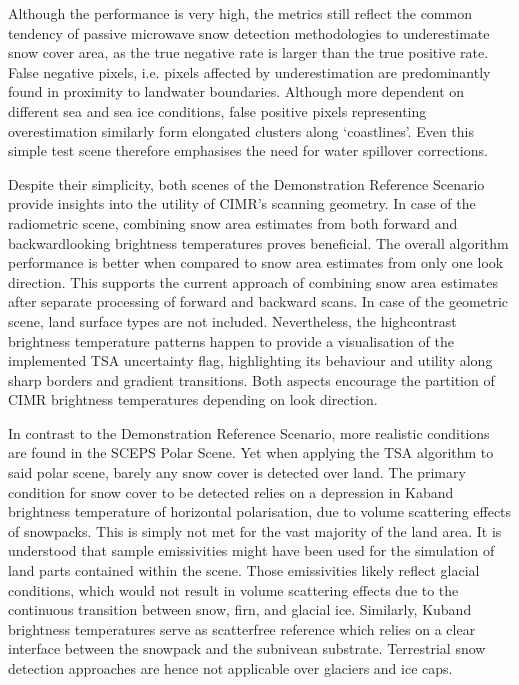 \documentclass[letterpaper,10pt,english]{jupyterBook}
\begin{document}
\sphinxAtStartPar
Although the performance is very high, the metrics still reflect the common tendency of passive microwave snow detection methodologies to underestimate snow cover area, as the true negative rate is larger than the true positive rate.
False negative pixels, i.e. pixels affected by underestimation are predominantly found in proximity to land\sphinxhyphen{}water boundaries.
Although more dependent on different sea and sea ice conditions, false positive pixels representing overestimation similarly form elongated clusters along ‘coastlines’.
Even this simple test scene therefore emphasises the need for water spill\sphinxhyphen{}over corrections.

\sphinxAtStartPar
Despite their simplicity, both scenes of the Demonstration Reference Scenario provide insights into the utility of CIMR’s scanning geometry.
In case of the radiometric scene, combining snow area estimates from both forward and backward\sphinxhyphen{}looking brightness temperatures proves beneficial.
The overall algorithm performance is better when compared to snow area estimates from only one look direction.
This supports the current approach of combining snow area estimates after separate processing of forward and backward scans.
In case of the geometric scene, land surface types are not included.
Nevertheless, the high\sphinxhyphen{}contrast brightness temperature patterns happen to provide a visualisation of the implemented TSA uncertainty flag, highlighting its behaviour and utility along sharp borders and gradient transitions.
Both aspects encourage the partition of CIMR brightness temperatures depending on look direction.

\sphinxAtStartPar
In contrast to the Demonstration Reference Scenario, more realistic conditions are found in the SCEPS Polar Scene.
Yet when applying the TSA algorithm to said polar scene, barely any snow cover is detected over land.
The primary condition for snow cover to be detected relies on a depression in Ka\sphinxhyphen{}band brightness temperature of horizontal polarisation, due to volume scattering effects of snowpacks.
This is simply not met for the vast majority of the land area.
It is understood that sample emissivities might have been used for the simulation of land parts contained within the scene.
Those emissivities likely reflect glacial conditions, which would not result in volume scattering effects due to the continuous transition between snow, firn, and glacial ice.
Similarly, Ku\sphinxhyphen{}band brightness temperatures serve as scatter\sphinxhyphen{}free reference which relies on a clear interface between the snowpack and the subnivean substrate.
Terrestrial snow detection approaches are hence not applicable over glaciers and ice caps.
\end{document}
